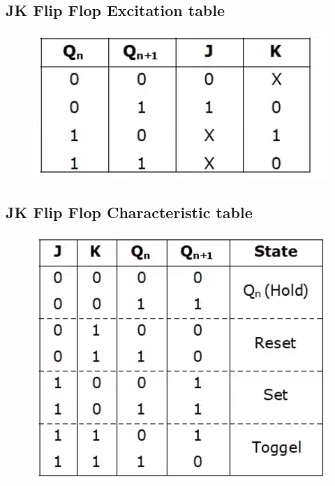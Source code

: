 \documentclass[11pt]{article}
\begin{document}
\subsection{JK Flip Flop Excitation table}
\begin{figure}[H]
	\centering
	\includegraphics[scale = 0.4]{jk flip flop excitation table.png}
\end{figure}
\subsection{JK Flip Flop Characteristic table}
\begin{figure}[H]
	\centering
	\includegraphics[scale = 0.4]{jk flip flop characteristic table.png}
\end{figure}
\end{document}
